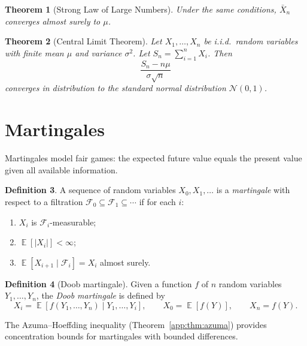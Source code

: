 \documentclass[twoside,12pt]{book}
\theoremstyle{plain}
\newtheorem{theorem}{Theorem}[chapter]
\theoremstyle{definition}
\newtheorem{definition}[theorem]{Definition}
\theoremstyle{remark}
\newcommand{\Exp}{\operatorname{\mathbb{E}}}
\begin{document}
\begin{theorem}[Strong Law of Large Numbers]
Under the same conditions, $\bar{X}_n$ converges almost surely to $\mu$.
\end{theorem}

\begin{theorem}[Central Limit Theorem]
Let $X_1, \ldots, X_n$ be i.i.d.\ random variables with finite mean $\mu$
and variance $\sigma^2$. Let $S_n = \sum_{i=1}^{n} X_i$. Then
\[
\frac{S_n - n\mu}{\sigma\sqrt{n}}
\]
converges in distribution to the standard normal distribution
$\mathcal{N}(0, 1)$.
\end{theorem}

\section{Martingales}
\label{app:sec:martingales}

Martingales model fair games: the expected future value equals the present
value given all available information.

\begin{definition}
A sequence of random variables $X_0, X_1, \ldots$ is a \emph{martingale}
with respect to a filtration $\mathcal{F}_0 \subseteq \mathcal{F}_1
\subseteq \cdots$ if for each $i$:
\begin{enumerate}
\item $X_i$ is $\mathcal{F}_i$-measurable;
\item $\Exp[|X_i|] < \infty$;
\item $\Exp[X_{i+1} \mid \mathcal{F}_i] = X_i$ almost surely.
\end{enumerate}
\end{definition}

\begin{definition}[Doob martingale]
Given a function $f$ of $n$ random variables $Y_1, \ldots, Y_n$, the
\emph{Doob martingale} is defined by
\[
X_i = \Exp[f(Y_1,\ldots,Y_n) \mid Y_1,\ldots,Y_i],
\qquad X_0 = \Exp[f(Y)],\qquad X_n = f(Y).
\]
\end{definition}

The Azuma--Hoeffding inequality (Theorem~\ref{app:thm:azuma}) provides
concentration bounds for martingales with bounded differences.








\end{document}
